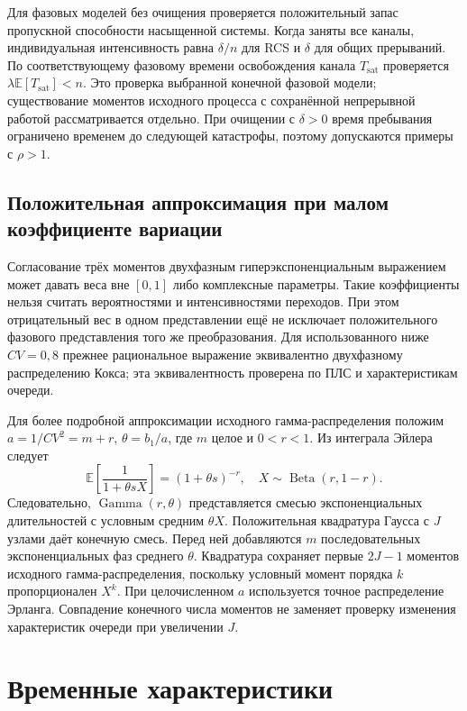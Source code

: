 Для фазовых моделей без очищения проверяется положительный запас пропускной способности насыщенной системы. Когда заняты все каналы, индивидуальная интенсивность равна \(\delta/n\) для RCS и \(\delta\) для общих прерываний. По соответствующему фазовому времени освобождения канала \(T_{\mathrm{sat}}\) проверяется \(\lambda\mathbb E[T_{\mathrm{sat}}]<n\). Это проверка выбранной конечной фазовой модели; существование моментов исходного процесса с сохранённой непрерывной работой рассматривается отдельно. При очищении с \(\delta>0\) время пребывания ограничено временем до следующей катастрофы, поэтому допускаются примеры с \(\rho>1\).

\subsection{Положительная аппроксимация при малом коэффициенте вариации}
Согласование трёх моментов двухфазным гиперэкспоненциальным выражением может давать веса вне \([0,1]\) либо комплексные параметры. Такие коэффициенты нельзя считать вероятностями и интенсивностями переходов. При этом отрицательный вес в одном представлении ещё не исключает положительного фазового представления того же преобразования. Для использованного ниже \(CV=0{,}8\) прежнее рациональное выражение эквивалентно двухфазному распределению Кокса; эта эквивалентность проверена по ПЛС и характеристикам очереди.

Для более подробной аппроксимации исходного гамма-распределения положим \(a=1/CV^2=m+r\), \(\theta=b_1/a\), где \(m\) целое и \(0<r<1\). Из интеграла Эйлера \cite{nistdlmf} следует
\[
\mathbb E\!\left[\frac{1}{1+\theta sX}\right]=(1+\theta s)^{-r},\quad
X\sim\operatorname{Beta}(r,1-r).
\]
Следовательно, \(\operatorname{Gamma}(r,\theta)\) представляется смесью экспоненциальных длительностей с условным средним \(\theta X\). Положительная квадратура Гаусса с \(J\) узлами даёт конечную смесь. Перед ней добавляются \(m\) последовательных экспоненциальных фаз среднего \(\theta\). Квадратура сохраняет первые \(2J-1\) моментов исходного гамма-распределения, поскольку условный момент порядка \(k\) пропорционален \(X^k\). При целочисленном \(a\) используется точное распределение Эрланга. Совпадение конечного числа моментов не заменяет проверку изменения характеристик очереди при увеличении \(J\).

\section{Временные характеристики}\label{sec:times}

